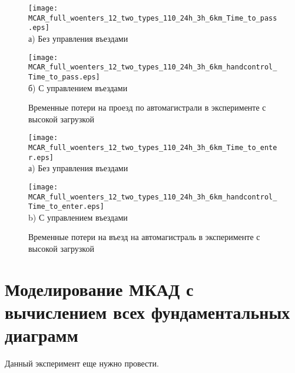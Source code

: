 \begin{figure}[ht]
    \begin{minipage}[b][][b]{.49\textwidth}
        \centering
        \texttt{[image: MCAR\_full\_woenters\_12\_two\_types\_110\_24h\_3h\_6km\_Time\_to\_pass.eps]} \\ а) Без управления въездами
    \end{minipage}
    \hfill
    \begin{minipage}[b][][b]{.49\textwidth}
        \centering
        \texttt{[image: MCAR\_full\_woenters\_12\_two\_types\_110\_24h\_3h\_6km\_handcontrol\_Time\_to\_pass.eps]} \\ б) С управлением въездами
    \end{minipage}

    \caption{Временные потери на проезд по автомагистрали в эксперименте с высокой загрузкой}
    \label{fig:MCAR_timeloss_hight_3h_6km}
\end{figure}

\begin{figure}[ht]
    \begin{minipage}[b][][b]{.49\textwidth}
        \centering
        \texttt{[image: MCAR\_full\_woenters\_12\_two\_types\_110\_24h\_3h\_6km\_Time\_to\_enter.eps]}  \\ а) Без управления въездами
    \end{minipage}
    \hfill
    \begin{minipage}[b][][b]{.49\textwidth}
        \centering
        \texttt{[image: MCAR\_full\_woenters\_12\_two\_types\_110\_24h\_3h\_6km\_handcontrol\_Time\_to\_enter.eps]}  \\ b) С управлением въездами
    \end{minipage}

    \caption{Временные потери на въезд на автомагистраль в эксперименте с высокой загрузкой}
    \label{fig:MCAR_timeloss_enter_hight_3h_6km}
\end{figure}



\section{Моделирование МКАД с вычислением всех фундаментальных диаграмм}\label{sec:ch4/sec3}

Данный эксперимент еще нужно провести.

\clearpage